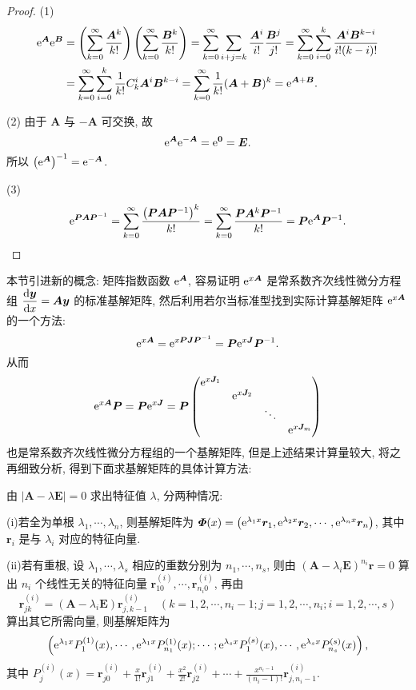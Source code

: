 \begin{proof}
  (1)
  \[\begin{split}
    \mathrm{e}^{\bm{A}}\mathrm{e}^{\bm{B}}
    & = \left(\sum_{k=0}^{\infty}\frac{\bm{A}^k}{k!}\right)\left(\sum_{k=0}^{\infty}\frac{\bm{B}^k}{k!}\right)
      = \sum_{k=0}^{\infty}\sum_{i+j=k}\frac{\bm{A}^i}{i!}\frac{\bm{B}^j}{j!}
      = \sum_{k=0}^{\infty}\sum_{i=0}^k\frac{\bm{A}^i\bm{B}^{k-i}}{i!(k-i)!} \\
    & = \sum_{k=0}^{\infty}\sum_{i=0}^k\frac{1}{k!}C_k^i\bm{A}^i\bm{B}^{k-i}=\sum_{k=0}^{\infty}\frac{1}{k!}(\bm{A}+\bm{B})^k=\mathrm{e}^{\bm{A}+\bm{B}}.
  \end{split}\]

  (2) 由于 $\bm{A}$ 与 $-\bm{A}$ 可交换, 故
  \[\mathrm{e}^{\bm{A}}\mathrm{e}^{-\bm{A}}=\mathrm{e}^{\bm{0}} = \bm{E}.\]
  所以 $\left(\mathrm{e}^{\bm{A}}\right)^{-1}=\mathrm{e}^{-\bm{A}}$.

  (3)
  \[\mathrm{e}^{\bm{P}\bm{A}\bm{P}^{-1}}=\sum_{k=0}^{\infty}\frac{\left(\bm{P}\bm{A}\bm{P}^{-1}\right)^k}{k!}=\sum_{k=0}^{\infty}\frac{\bm{P}\bm{A}^k\bm{P}^{-1}}{k!}=\bm{P}\mathrm{e}^{\bm{A}}\bm{P}^{-1}.\qedhere\]
\end{proof}


本节引进新的概念: 矩阵指数函数 $\mathrm{e}^{\bm{A}}$, 
容易证明 $\mathrm{e}^{x\bm{A}}$ 是常系数齐次线性微分方程组
$\displaystyle\frac{\mathop{}\!\mathrm{d}\bm{y}}{\mathop{}\!\mathrm{d} x}=\bm{A}\bm{y}$ 的标准基解矩阵, 
然后利用若尔当标准型找到实际计算基解矩阵 $\mathrm{e}^{x\bm{A}}$ 的一个方法:
\[\mathrm{e}^{x\bm{A}}=\mathrm{e}^{x\bm{P}\bm{J}\bm{P}^{-1}}=\bm{P}\mathrm{e}^{x\bm{J}}\bm{P}^{-1}.\]
从而
\[\mathrm{e}^{x\bm{A}}\bm{P}=\bm{P}\mathrm{e}^{x\bm{J}}
  =\bm{P}\begin{pmatrix}\mathrm{e}^{x\bm{J}_1}&&&\\&\mathrm{e}^{x\bm{J}_2}&&\\&&\ddots&\\&&&\mathrm{e}^{x\bm{J}_m}
\end{pmatrix}\]
也是常系数齐次线性微分方程组的一个基解矩阵, 但是上述结果计算量较大, 将之再细致分析, 得到下面求基解矩阵的具体计算方法:

由 $|\bm{A}-\lambda\bm{E}|=0$ 求出特征值 $\lambda$, 分两种情况:

(i)若全为单根 $\lambda_1,\cdots,\lambda_n$, 
则基解矩阵为 $\bm{\varPhi}(x)=\left(\mathrm{e}^{\lambda_1x}\bm{r}_1,\mathrm{e}^{\lambda_2x}\bm{r}_2,\cdots,\mathrm{e}^{\lambda_nx}\bm{r}_n\right)$, 
其中 $\bm{r}_i$ 是与 $\lambda_i$ 对应的特征向量.

(ii)若有重根, 设 $\lambda_1,\cdots,\lambda_s$ 相应的重数分别为 $n_1,\cdots,n_s$, 
则由 $(\bm{A}-\lambda_i\bm{E})^{n_i}\bm{r}=0$ 
算出 $n_i$ 个线性无关的特征向量 $\bm{r}_{10}^{(i)},\cdots,\bm{r}_{n_i0}^{(i)}$, 再由
\[\bm{r}_{jk}^{(i)}=(\bm{A}-\lambda_i\bm{E})\bm{r}_{j,k-1}^{(i)}
\quad (k=1,2,\cdots,n_i-1;j=1,2,\cdots,n_i;i=1,2,\cdots,s)\]
算出其它所需向量, 则基解矩阵为
\[\left(\mathrm{e}^{\lambda_1x}P_1^{(1)}(x),\cdots,\mathrm{e}^{\lambda_1x}P_{n_1}^{(1)}(x);\cdots;
  \mathrm{e}^{\lambda_sx}P_1^{(s)}(x),\cdots,\mathrm{e}^{\lambda_sx}P_{n_s}^{(s)}(x)\right),\]
其中 $\displaystyle P_j^{(i)}(x)=\bm{r}_{j0}^{(i)}+\frac{x}{1!}\bm{r}_{j1}^{(i)}+\frac{x^2}{2!}\bm{r}_{j2}^{(i)}+\cdots+\frac{x^{n_i-1}}{(n_i-1)!}\bm{r}_{j,n_i-1}^{(i)}$.



